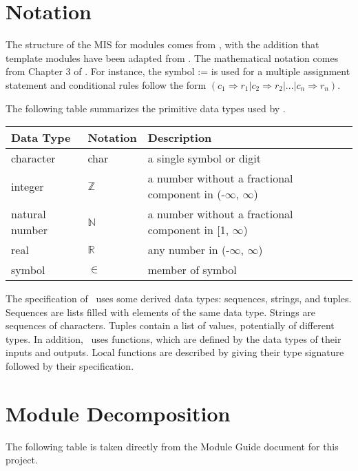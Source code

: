 \documentclass[12pt, titlepage]{article}
\begin{document}
\section{Notation}

The structure of the MIS for modules comes from \citet{HoffmanAndStrooper1995},
with the addition that template modules have been adapted from
\cite{GhezziEtAl2003}.  The mathematical notation comes from Chapter 3 of
\citet{HoffmanAndStrooper1995}.  For instance, the symbol := is used for a
multiple assignment statement and conditional rules follow the form $(c_1
\Rightarrow r_1 | c_2 \Rightarrow r_2 | ... | c_n \Rightarrow r_n )$.

The following table summarizes the primitive data types used by \progname. 

\begin{center}
\renewcommand{\arraystretch}{1.2}
\noindent 
\begin{tabular}{l l p{7.5cm}} 
\toprule 
\textbf{Data Type} & \textbf{Notation} & \textbf{Description}\\ 
\midrule
character & char & a single symbol or digit\\
integer & $\mathbb{Z}$ & a number without a fractional component in (-$\infty$, $\infty$) \\
natural number & $\mathbb{N}$ & a number without a fractional component in [1, $\infty$) \\
real & $\mathbb{R}$ & any number in (-$\infty$, $\infty$)\\
symbol & $\in$ & member of symbol\\
\bottomrule
\end{tabular} 
\end{center}

\noindent
The specification of \progname \ uses some derived data types: sequences, strings, and
tuples. Sequences are lists filled with elements of the same data type. Strings
are sequences of characters. Tuples contain a list of values, potentially of
different types. In addition, \progname \ uses functions, which
are defined by the data types of their inputs and outputs. Local functions are
described by giving their type signature followed by their specification.

\section{Module Decomposition}

The following table is taken directly from the Module Guide document for this project.
\end{document}
